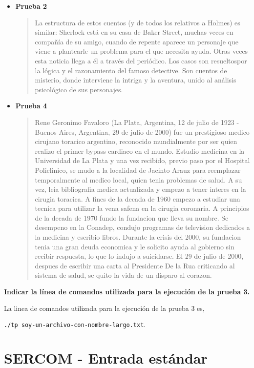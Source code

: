 \documentclass{article}
\begin{document}
\begin{itemize}
    \item \textbf{Prueba 2}
    
    \blockquote{La estructura de estos cuentos (y de todos los relativos a Holmes) es 
similar: Sherlock está en su casa de Baker Street, muchas veces en compañía 
de su amigo, cuando de repente aparece un personaje que viene a plantearle 
un problema para el que necesita ayuda. Otras veces esta noticia llega a él 
a través del periódico. Los casos son resueltospor la lógica y el 
razonamiento del famoso detective. Son cuentos de misterio, donde interviene 
la intriga y la aventura, unido al análisis psicológico de sus personajes.}

    \item \textbf{Prueba 4}
    
    \blockquote{Rene Geronimo Favaloro (La Plata, Argentina, 12 de julio de 1923 - Buenos 
Aires, Argentina, 29 de julio de 2000) fue un prestigioso medico cirujano 
toracico argentino, reconocido mundialmente por ser quien realizo el primer 
bypass cardiaco en el mundo. Estudio medicina en la Universidad de La Plata 
y una vez recibido, previo paso por el Hospital Policlinico, se mudo a la 
localidad de Jacinto Arauz para reemplazar temporalmente al medico local, 
quien tenia problemas de salud. A su vez, leia bibliografia medica 
actualizada y empezo a tener interes en la cirugia toracica. A fines de la 
decada de 1960 empezo a estudiar una tecnica para utilizar la vena safena 
en la cirugia coronaria. A principios de la decada de 1970 fundo la 
fundacion que lleva su nombre. Se desempeno en la Conadep, condujo 
programas de television dedicados a la medicina y escribio libros. 
Durante la crisis del 2000, su fundacion tenia una gran deuda economica y 
le solicito ayuda al gobierno sin recibir respuesta, lo que lo indujo a 
suicidarse. El 29 de julio de 2000, despues de escribir una carta al 
Presidente De la Rua criticando al sistema de salud, se quito la vida de un 
disparo al corazon.}
\end{itemize}

\textbf{Indicar la línea de comandos utilizada para la ejecución de la prueba 3.}\newline

La linea de comandos utilizada para la ejecución de la prueba 3 es, 

\texttt{./tp soy-un-archivo-con-nombre-largo.txt}.

\section{SERCOM - Entrada estándar}
\end{document}
